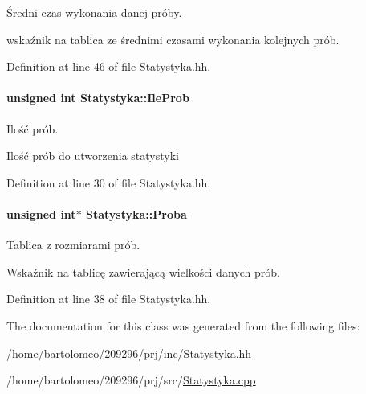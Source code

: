 Średni czas wykonania danej próby. 

wskaźnik na tablica ze średnimi czasami wykonania kolejnych prób. 

Definition at line 46 of file Statystyka.\-hh.

\hypertarget{class_statystyka_af8bf74c21adf05068de9f7a02431ff6f}{
\paragraph[{Ile\-Prob}]{\setlength{\rightskip}{0pt plus 5cm}unsigned int Statystyka\-::\-Ile\-Prob\hspace{0.3cm}{\ttfamily [private]}}}\label{class_statystyka_af8bf74c21adf05068de9f7a02431ff6f}


Ilość prób. 

Ilość prób do utworzenia statystyki 

Definition at line 30 of file Statystyka.\-hh.

\hypertarget{class_statystyka_a4a34deeb4851d6e1418ba4e8f427e003}{
\paragraph[{Proba}]{\setlength{\rightskip}{0pt plus 5cm}unsigned int$\ast$ Statystyka\-::\-Proba\hspace{0.3cm}{\ttfamily [private]}}}\label{class_statystyka_a4a34deeb4851d6e1418ba4e8f427e003}


Tablica z rozmiarami prób. 

Wskaźnik na tablicę zawierającą wielkości danych prób. 

Definition at line 38 of file Statystyka.\-hh.



The documentation for this class was generated from the following files\-:\begin{DoxyCompactItemize}
\item 
/home/bartolomeo/209296/prj/inc/\hyperlink{_statystyka_8hh}{Statystyka.\-hh}\item 
/home/bartolomeo/209296/prj/src/\hyperlink{_statystyka_8cpp}{Statystyka.\-cpp}\end{DoxyCompactItemize}
